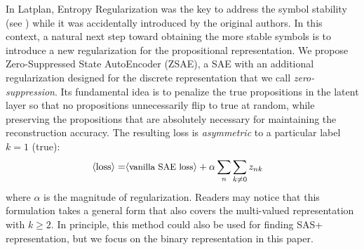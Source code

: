 In Latplan, Entropy Regularization was the key to address the symbol stability (see )
while it was accidentally introduced by the original authors.
In this context, a natural next step toward obtaining the more stable symbols is to introduce a new regularization
for the propositional representation.
We propose Zero-Suppressed State AutoEncoder (ZSAE),
a SAE with an additional regularization designed for the discrete representation that we call \emph{zero-suppression}.
% 
Its fundamental idea is to penalize the
true propositions in the latent layer so that no propositions unnecessarily flip to true at random,
while preserving the propositions that are absolutely necessary for maintaining the reconstruction accuracy.
% 
The resulting loss is 
\emph{asymmetric} to a particular label $k=1$ (true):
\begin{align*}
 \brackets{\text{loss}} = & \brackets{\text{\small vanilla SAE loss}} + \alpha \sum_n \sum_{k\not=0} z_{nk} %
\end{align*}
where $\alpha$ is the magnitude of regularization.
Readers may notice that this formulation takes a general form
that also covers the multi-valued representation with $k\geq 2$.
In principle, this method could also be used for finding SAS+ representation,
but we focus on the binary representation in this paper.

